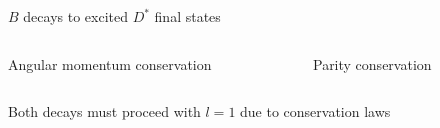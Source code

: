 \documentclass[dvipsnames]{beamer}
\begin{document}
\begin{frame}{$B$ decays to excited $D^*$ final states}
\begin{figure}[H]
\begin{subfigure}{0.45\textwidth}
    \end{subfigure}
  \end{figure}
  \vspace{-0.5cm}
  \begin{columns}
    \begin{column}{0.5\textwidth}
      \begin{center}
        Angular momentum conservation
      \end{center}
    \end{column}
    \begin{column}{0.5\textwidth}
      \begin{center}
        Parity conservation
      \end{center}
    \end{column}
  \end{columns}
  \begin{center}
  {\large Both decays must proceed with \underline{$l = 1$} due to conservation laws}
  \end{center}
  \vspace{0.64cm}
\end{frame}
\end{document}
